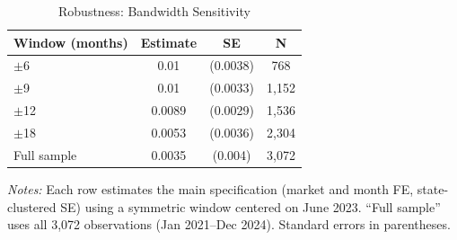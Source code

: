 \begin{table}[htbp]
\centering
\caption{Robustness: Bandwidth Sensitivity}
\label{tab:robustness_bw}
\begin{tabular}{lccc}
\hline\hline
Window (months) & Estimate & SE & N \\
\hline
$\pm$6 & 0.01 & (0.0038) & 768 \\
$\pm$9 & 0.01 & (0.0033) & 1,152 \\
$\pm$12 & 0.0089 & (0.0029) & 1,536 \\
$\pm$18 & 0.0053 & (0.0036) & 2,304 \\
Full sample & 0.0035 & (0.004) & 3,072 \\
\hline\hline
\end{tabular}
\begin{minipage}{0.7\textwidth}
\small\textit{Notes:} Each row estimates the main specification (market and month FE, state-clustered SE) using a symmetric window centered on June 2023. ``Full sample'' uses all 3,072 observations (Jan 2021--Dec 2024). Standard errors in parentheses.
\end{minipage}
\end{table}
